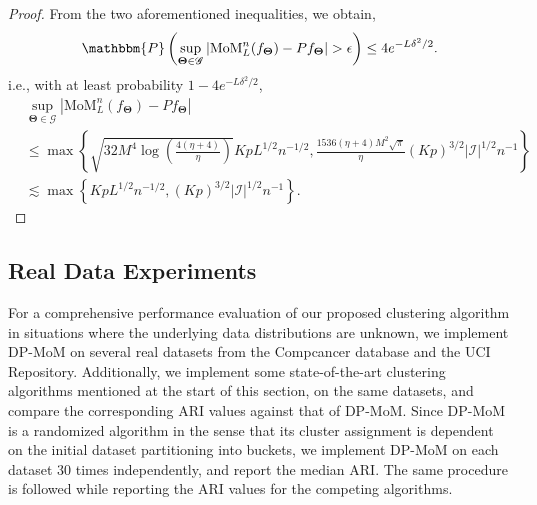 \documentclass{article}
\newcommand{\bTheta}{\boldsymbol{\Theta}}
\newcommand{\I}{\mathcal{I}}
\newcommand{\sP}{\mathbbm{P}}
\begin{document}
\begin{proof}
From the two aforementioned inequalities, we obtain, 
\[\sP\left( \sup_{\bTheta \in \mathscr{G}} |\text{MoM}^n_L (f_{\bTheta}) -Pf_{\bTheta} | > \epsilon \right) \le 4e^{-L \delta^2/2}.\]
i.e., with at least probability $1-4e^{-L \delta^2/2}$,
\begin{align*}
    & \sup_{\bTheta \in \mathscr{G}} |\text{MoM}^n_L (f_{\bTheta}) -Pf_{\bTheta} | \\
    &\le \max\left\{\sqrt{32  M^4 \log\left(\frac{4(\eta+4)}{\eta}\right)}KpL^{1/2}n^{-1/2}, \frac{1536(\eta+4)  M^2 \sqrt{\pi}}{\eta} (Kp)^{3/2} |\I|^{1/2}n^{-1}\right\}\\
    &\lesssim \max\left\{ KpL^{1/2}n^{-1/2}, (Kp)^{3/2}  |\I|^{1/2}n^{-1}\right\}.
\end{align*}
\end{proof}

\subsection{Real Data Experiments}




For a comprehensive performance evaluation of our proposed clustering algorithm in situations where the underlying data distributions are unknown, we implement DP-MoM on several real datasets from the Compcancer database and the UCI Repository. Additionally, we implement some state-of-the-art clustering algorithms mentioned at the start of this section, on the same datasets, and compare the corresponding ARI values against that of DP-MoM. Since DP-MoM is a randomized algorithm in the sense that its cluster assignment is dependent on the initial dataset partitioning into buckets, we implement DP-MoM on each dataset $30$ times independently, and report the median ARI. The same procedure is followed while reporting the ARI values for the competing algorithms.
\end{document}
